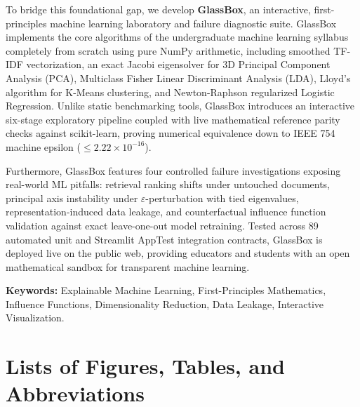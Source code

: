 \documentclass[12pt,a4paper]{report}
\begin{document}
To bridge this foundational gap, we develop \textbf{GlassBox}, an interactive, first-principles machine learning laboratory and failure diagnostic suite. GlassBox implements the core algorithms of the undergraduate machine learning syllabus completely from scratch using pure NumPy arithmetic, including smoothed TF-IDF vectorization, an exact Jacobi eigensolver for 3D Principal Component Analysis (PCA), Multiclass Fisher Linear Discriminant Analysis (LDA), Lloyd's algorithm for K-Means clustering, and Newton-Raphson regularized Logistic Regression. Unlike static benchmarking tools, GlassBox introduces an interactive six-stage exploratory pipeline coupled with live mathematical reference parity checks against scikit-learn, proving numerical equivalence down to IEEE 754 machine epsilon ($\le 2.22 \times 10^{-16}$). 

Furthermore, GlassBox features four controlled failure investigations exposing real-world ML pitfalls: retrieval ranking shifts under untouched documents, principal axis instability under $\varepsilon$-perturbation with tied eigenvalues, representation-induced data leakage, and counterfactual influence function validation against exact leave-one-out model retraining. Tested across 89 automated unit and Streamlit AppTest integration contracts, GlassBox is deployed live on the public web, providing educators and students with an open mathematical sandbox for transparent machine learning.

\vspace{0.8cm}
\noindent
\textbf{Keywords:} Explainable Machine Learning, First-Principles Mathematics, Influence Functions, Dimensionality Reduction, Data Leakage, Interactive Visualization.

\newpage

\setcounter{tocdepth}{1}
\tableofcontents

\newpage

\chapter*{Lists of Figures, Tables, and Abbreviations}
\thispagestyle{fancy}
\end{document}

